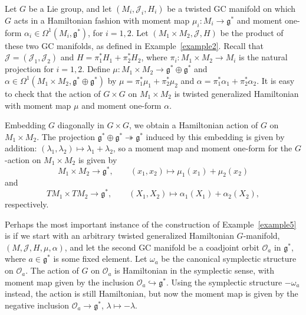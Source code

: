 \documentclass[pdftex]{sigma}
\numberwithin{equation}{section}
\newcommand{\func}[3]{#1 \colon #2 \to #3}
\newcommand{\tang}{T}
\begin{document}
\begin{Example} \label{example5}
Let $G$ be a Lie group, and let $(M_i,\mathcal{J}_i,H_i)$ be a twisted GC manifold on which $G$ acts in a Hamiltonian fashion with moment map $\func{\mu_i}{M_i}{\mathfrak{g}^*}$ and moment one-form $\alpha_i \in \Omega^1(M_i,\mathfrak{g}^*)$, for $i=1,2$.  Let $(M_1 \times M_2, \mathcal{J}, H)$ be the product of these two GC manifolds, as def\/ined in Example~\ref{example2}.  Recall that $\mathcal{J} = (\mathcal{J}_1,\mathcal{J}_2)$ and $H = \pi_1^* H_1 + \pi_2^* H_2$, where $\func{\pi_i}{M_1 \times M_2}{M_i}$ is the natural projection for $i=1,2$.  Def\/ine $\func{\mu}{M_1 \times M_2}{\mathfrak{g}^* \oplus \mathfrak{g}^*}$ and $\alpha \in \Omega^1(M_1 \times M_2, \mathfrak{g}^* \oplus \mathfrak{g}^*)$ by $\mu = \pi_1^* \mu_1 + \pi_2^* \mu_2$ and $\alpha = \pi_1^* \alpha_1 + \pi_2^* \alpha_2$.  It is easy to check that the action of $G \times G$ on $M_1 \times M_2$ is twisted generalized Hamiltonian with moment map $\mu$ and moment one-form $\alpha$.

Embedding $G$ diagonally in $G \times G$, we obtain a Hamiltonian action of $G$ on $M_1 \times M_2$.  The projection $\mathfrak{g}^* \oplus \mathfrak{g}^* \twoheadrightarrow \mathfrak{g}^*$ induced by this embedding is given by addition: $(\lambda_1, \lambda_2) \mapsto \lambda_1 + \lambda_2$, so a moment map and moment one-form for the $G$-action on $M_1 \times M_2$ is given by
\[
  M_1 \times M_2 \to \mathfrak{g}^*,
  \qquad
  (x_1,x_2) \mapsto \mu_1(x_1) + \mu_2(x_2)
\]
and
\[
  \tang M_1 \times \tang M_2
  \to \mathfrak{g}^*,
  \qquad
  (X_1,X_2) \mapsto \alpha_1(X_1) + \alpha_2(X_2),
\]
respectively.
\end{Example}


Perhaps the most important instance of the construction of Example~\ref{example5} is if we start with an arbitrary twisted generalized Hamiltonian $G$-manifold, $(M,\mathcal{J},H,\mu,\alpha)$, and let the second GC manifold be a coadjoint orbit $\mathcal{O}_{a}$ in $\mathfrak{g}^*$, where $a \in \mathfrak{g}^*$ is some f\/ixed element.  Let $\omega_{a}$ be the canonical symplectic structure on $\mathcal{O}_{a}$.  The action of $G$ on $\mathcal{O}_{a}$ is Hamiltonian in the symplectic sense, with moment map given by the inclusion $\mathcal{O}_{a} \hookrightarrow \mathfrak{g}^*$.  Using the symplectic structure $-\omega_{a}$ instead, the action is still Hamiltonian, but now the moment map is given by the negative inclusion $\mathcal{O}_{a} \to \mathfrak{g}^*$, $\lambda \mapsto -\lambda$.
\end{document}
